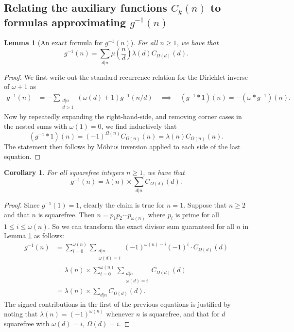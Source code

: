 \documentclass[11pt,reqno,a4letter]{article}
\numberwithin{figure}{section}
\numberwithin{table}{section}
\theoremstyle{plain}
\newtheorem{lemma}[theorem]{Lemma}
\newtheorem{cor}[theorem]{Corollary}
\numberwithin{theorem}{section}
\theoremstyle{definition}
\begin{document}
\subsection{Relating the auxiliary functions $C_k(n)$ to formulas approximating $g^{-1}(n)$} 

\begin{lemma}[An exact formula for $g^{-1}(n)$] 
\label{lemma_AnExactFormulaFor_gInvByMobiusInv_v1} 
For all $n \geq 1$, we have that 
\[
g^{-1}(n) = \sum_{d|n} \mu\left(\frac{n}{d}\right) \lambda(d) C_{\Omega(d)}(d). 
\]
\end{lemma}
\begin{proof} 
We first write out the standard recurrence relation for the Dirichlet inverse of 
$\omega+1$ as 
\begin{align*} 
g^{-1}(n) & = - \sum_{\substack{d|n \\ d>1}} (\omega(d) + 1) g^{-1}(n/d) 
     \quad\implies\quad 
     (g^{-1} \ast 1)(n) = -(\omega \ast g^{-1})(n). 
\end{align*} 
Now by repeatedly expanding the right-hand-side, and removing corner cases in the nested sums with 
$\omega(1) = 0$, we find inductively that 
\[
(g^{-1} \ast 1)(n) = (-1)^{\Omega(n)} C_{\Omega(n)}(n) = \lambda(n) C_{\Omega(n)}(n). 
\]
The statement then follows by M\"obius inversion applied to each side of the last equation. 
\end{proof} 

\begin{cor} 
\label{cor_AnExactFormulaFor_gInvByMobiusInv_nSqFree_v2} 
For all squarefree integers $n \geq 1$, we have that 
\begin{equation} 
\label{eqn_gInvnSqFreeN_exactDivSum_Formula} 
g^{-1}(n) = \lambda(n) \times \sum_{d|n} C_{\Omega(d)}(d). 
\end{equation} 
\end{cor} 
\begin{proof} 
Since $g^{-1}(1) = 1$, clearly the claim is true for $n = 1$. Suppose that $n \geq 2$ and that 
$n$ is squarefree. Then $n = p_1p_2 \cdots p_{\omega(n)}$ where $p_i$ is prime for all 
$1 \leq i \leq \omega(n)$. So we can transform the exact divisor sum guaranteed for all $n$ in 
Lemma \ref{lemma_AnExactFormulaFor_gInvByMobiusInv_v1} as follows: 
\begin{align*} 
g^{-1}(n) & = \sum_{i=0}^{\omega(n)} \sum_{\substack{d|n \\ \omega(d)=i}} (-1)^{\omega(n) - i} (-1)^{i} \cdot 
     C_{\Omega(d)}(d) \\ 
     & = \lambda(n) \times \sum_{i=0}^{\omega(n)} \sum_{\substack{d|n \\ \omega(d)=i}} C_{\Omega(d)}(d) \\ 
     & = \lambda(n) \times \sum_{d|n} C_{\Omega(d)}(d). 
\end{align*} 
The signed contributions in the first of the previous equations is 
justified by noting that $\lambda(n) = (-1)^{\omega(n)}$ 
whenever $n$ is squarefree, and that for $d$ squarefree with 
$\omega(d) = i$, $\Omega(d) = i$. 
\end{proof} 
\end{document}
